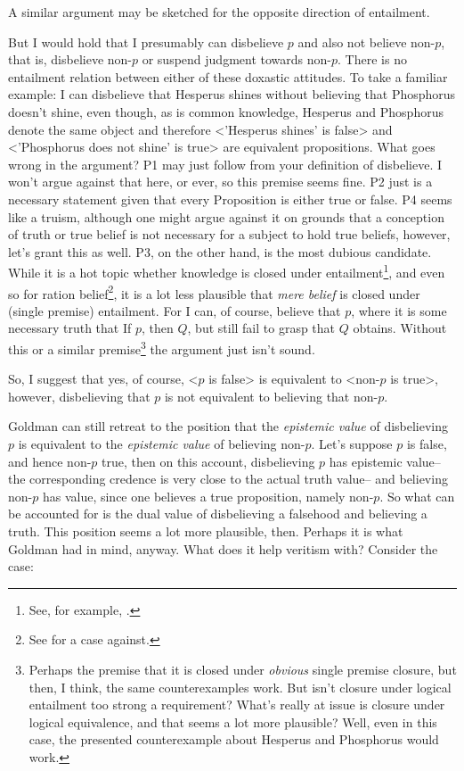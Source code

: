 \documentclass[12pt,numbers=noenddot]{scrartcl}
\begin{document}
A similar argument may be sketched for the opposite direction of entailment.

But I would hold that I presumably can disbelieve $p$ and also not believe non-$p$, that is, disbelieve non-$p$ or suspend judgment towards non-$p$. There is no entailment relation between either of these doxastic attitudes. To take a familiar example: I can disbelieve that Hesperus shines without believing that Phosphorus doesn't shine, even though, as is common knowledge, Hesperus and Phosphorus denote the same object and therefore <'Hesperus shines' is false> and <'Phosphorus does not shine' is true> are equivalent propositions. What goes wrong in the argument? P1 may just follow from your definition of disbelieve. I won't argue against that here, or ever, so this premise seems fine. P2 just is a necessary statement given that every Proposition is either true or false. P4 seems like a truism, although one might argue against it on grounds that a conception of truth or true belief is not necessary for a subject to hold true beliefs, however, let's grant this as well. P3, on the other hand, is the most dubious candidate. While it is a hot topic whether knowledge is closed under entailment\footnote{See, for example, \textcite{Dretske2005-DREIKC}.}, and even so for ration belief\footnote{See \textcite{KyburgJr1970-KYBC-2} for a case against.}, it is a lot less plausible that \emph{mere belief} is closed under (single premise) entailment. For I can, of course, believe that $p$, where it is some necessary truth that If $p$, then $Q$, but still fail to grasp that $Q$ obtains. Without this or a similar premise\footnote{Perhaps the premise that it is closed under \emph{obvious} single premise closure, but then, I think, the same counterexamples work. But isn't closure under logical entailment too strong a requirement? What's really at issue is closure under logical equivalence, and that seems a lot more plausible? Well, even in this case, the presented counterexample about Hesperus and Phosphorus would work.} the argument just isn't sound.

So, I suggest that yes, of course, <$p$ is false> is equivalent to <non-$p$ is true>, however, disbelieving that $p$ is not equivalent to believing that non-$p$.

Goldman can still retreat to the position that the \emph{epistemic value} of disbelieving $p$ is equivalent to the \emph{epistemic value} of believing non-$p$. Let's suppose $p$ is false, and hence non-$p$ true, then on this account, disbelieving $p$ has epistemic value–the corresponding credence is very close to the actual truth value– and believing non-$p$ has value, since one believes a true proposition, namely non-$p$. So what can be accounted for is the dual value of disbelieving a falsehood and believing a truth. This position seems a lot more plausible, then. Perhaps it is what Goldman had in mind, anyway. What does it help veritism with? Consider the case:
\end{document}

